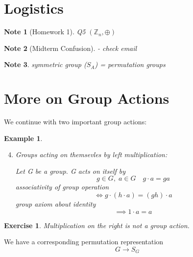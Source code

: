 \documentclass[11pt, oneside]{book}
\theoremstyle{break}
\newtheorem*{note}{Note}
\newtheorem{eg}{Example}[section]
\newtheorem{ex}{Exercise}[section]
\newcommand{\bb}[1]{\mathbb{#1}}			%
\begin{document}
\section{Logistics}

\begin{note}[Homework 1]
    Q5 $(\bb{Z}_n, \oplus)$
\end{note}

\begin{note}[Midterm Confusion]
    - check email
\end{note}

\begin{note}
    symmetric group ($S_A$) = permutation groups
\end{note}

\section{More on Group Actions}\label{sect:group_action_cont}

We continue with two important group actions:

\begin{eg}
    \begin{enumerate}
        \setcounter{enumi}{3}
        \item Groups acting on themsevles by left multiplication:

            Let G be a group. G acts on itself by
            \begin{equation}
                g \in G, \; a \in G \quad g \cdot a = ga
            \end{equation}
            associativity of group operation
            \begin{equation}
                \iff g \cdot (h \cdot a) = (gh) \cdot a
            \end{equation}
            group axiom about identity
            \begin{equation}
                \implies 1 \cdot a = a
            \end{equation}
    \end{enumerate}
\end{eg}

\begin{ex}
    Multiplication on the right is not a group action.
\end{ex}

We have a corresponding permutation representation
\begin{equation}
    G \to S_G
\end{equation}
\end{document}
